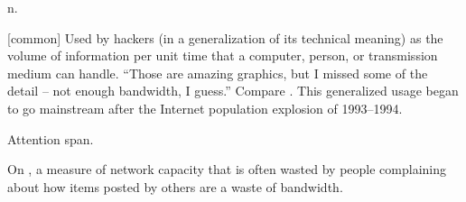  n.

\begin{inparaenum}
    \item {[}common] Used by hackers (in a generalization of its technical
        meaning) as the volume of information per unit time that a computer,
        person, or transmission medium can handle. ``Those are amazing graphics,
        but I missed some of the detail -- not enough bandwidth, I guess.''
        Compare . This generalized usage began to go
        mainstream after the Internet population explosion of 1993--1994.
    \item Attention span.
    \item On , a measure of network capacity that is often
        wasted by people complaining about how items posted by others are a
        waste of bandwidth.
\end{inparaenum}

